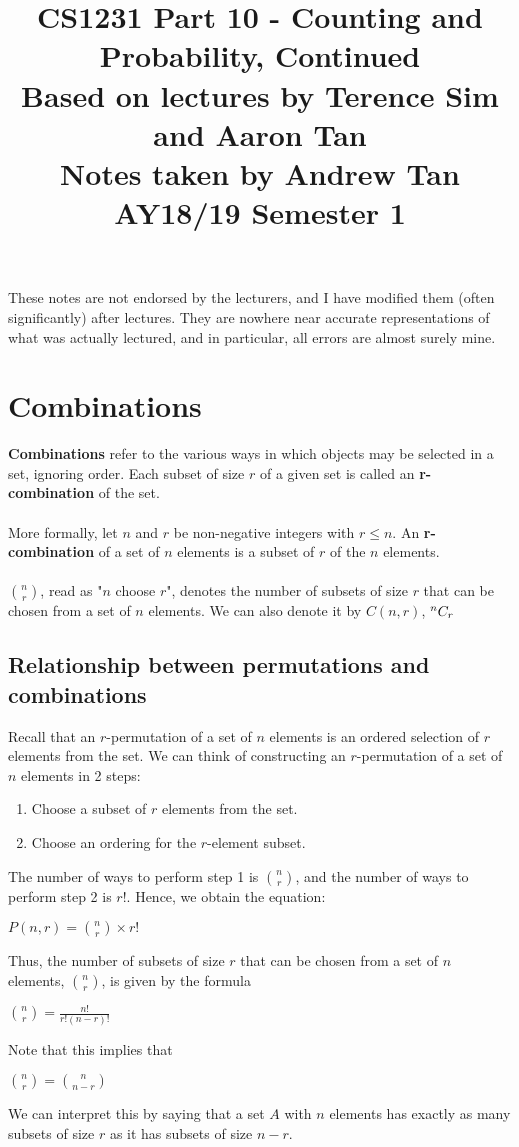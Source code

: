 \documentclass[a4paper]{article}
\title{%
	CS1231 Part 10 - Counting and Probability, Continued  \\
	\large Based on lectures by Terence Sim and Aaron Tan
	\\ Notes taken by Andrew Tan
	\\ AY18/19 Semester 1
	\\ }
\author{}
\date{\vspace{-5ex}}
\begin{document}
\maketitle

\begin{center}\begin{minipage}[c]{0.9\textwidth}\centering\footnotesize These notes are not endorsed by the lecturers, and I have modified them (often significantly) after lectures. They are nowhere near accurate representations of what was actually lectured, and in particular, all errors are almost surely mine.\end{minipage}\end{center}

\section{Combinations}
\textbf{Combinations} refer to the various ways in which objects may be selected in a set, ignoring order. Each subset of size $r$ of a given set is called an \textbf{r-combination} of the set.\\\\
More formally, let $n$ and $r$ be non-negative integers with $r\le n$. An \textbf{r-combination} of a set of $n$ elements is a subset of $r$ of the $n$ elements.\\\\
$n\choose r$, read as "$n$ choose $r$", denotes the number of subsets of size $r$ that can be chosen from a set of $n$ elements. We can also denote it by $C(n,r)$, ${}^{n}C_{r}$

\subsection{Relationship between permutations and combinations}
Recall that an $r$-permutation of a set of $n$ elements is an ordered selection of $r$ elements from the set. We can think of constructing an $r$-permutation of a set of $n$ elements in 2 steps:
\begin{enumerate}
	\item Choose a subset of $r$ elements from the set.
	\item Choose an ordering for the $r$-element subset.
\end{enumerate}
The number of ways to perform step 1 is $n \choose r$, and the number of ways to perform step 2 is $r!$. Hence, we obtain the equation:
\begin{center}
	$P(n,r) = {n \choose r} \times r!$
\end{center}
Thus, the number of subsets of size $r$ that can be chosen from a set of $n$ elements, $n\choose r$, is given by the formula
\begin{center}
	${n\choose r} = \frac{n!}{r!(n-r)!}$
\end{center}
Note that this implies that
\begin{center}
	${n\choose r} = {n\choose n-r}$
\end{center}
We can interpret this by saying that a set $A$ with $n$ elements has exactly as many subsets of size $r$ as it has subsets of size $n-r$.
\end{document}
